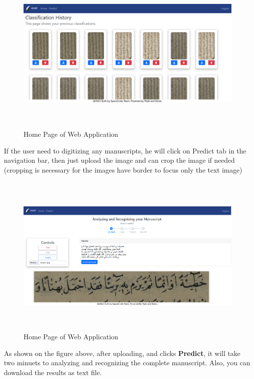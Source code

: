 \begin{figure}[!htb]
    \centering
    \includegraphics[width=15cm,height=8cm]{images/app/web/web-2.PNG}
    \caption{Home Page of Web Application}
    \label{fig:web-home-page}
\end{figure}

If the user need to digitizing any manuscripts, he will click on Predict tab in the navigation bar, then just upload the image and can crop the image if needed (cropping is necessary for the images have border to focus only the text image)

\begin{figure}[!htb]
    \centering
    \includegraphics[width=15cm,height=8cm]{images/app/web/web-3.PNG}
    \caption{Home Page of Web Application}
    \label{fig:web-home-page}
\end{figure}

As shown on the figure above, after uploading, and clicks \textbf{Predict}, it will take two minuets to analyzing and recognizing the complete manuscript. Also, you can download the results as text file. \\

